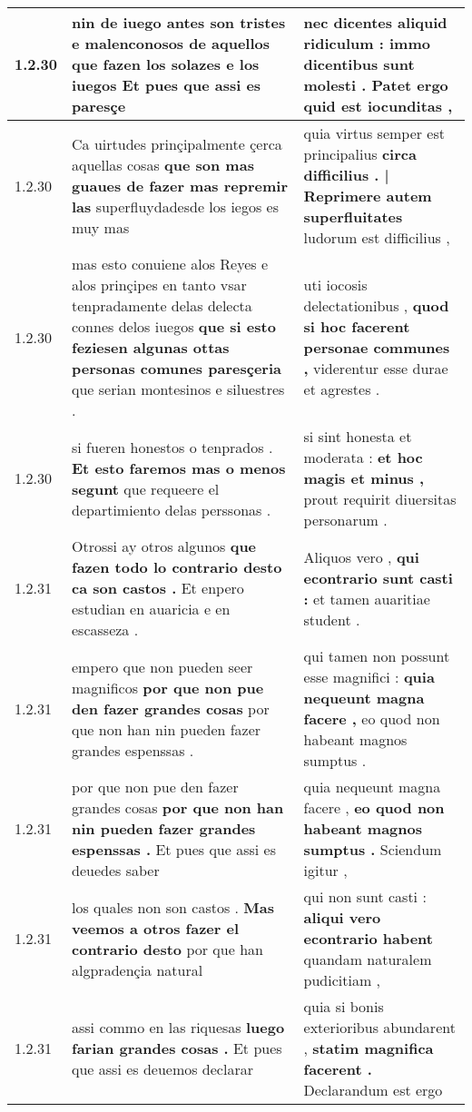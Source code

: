 \begin{tabular}{|p{1cm}|p{6.5cm}|p{6.5cm}|}
1.2.30 & nin de iuego antes son tristes e malenconosos de aquellos \textbf{ que fazen los solazes e los iuegos } Et pues que assi es paresçe & nec dicentes aliquid ridiculum : \textbf{ immo dicentibus sunt molesti . } Patet ergo quid est iocunditas , \\\hline
1.2.30 & Ca uirtudes prinçipalmente çerca aquellas cosas \textbf{ que son mas guaues de fazer mas repremir las } superfluydadesde los iegos es muy mas & quia virtus semper est principalius \textbf{ circa difficilius . | Reprimere autem superfluitates } ludorum est difficilius , \\\hline
1.2.30 & mas esto conuiene alos Reyes e alos prinçipes en tanto vsar tenpradamente delas delecta connes delos iuegos \textbf{ que si esto feziesen algunas ottas personas comunes paresçeria } que serian montesinos e siluestres . & uti iocosis delectationibus , \textbf{ quod si hoc facerent personae communes , } viderentur esse durae et agrestes . \\\hline
1.2.30 & si fueren honestos o tenprados . \textbf{ Et esto faremos mas o menos segunt } que requeere el departimiento delas perssonas . & si sint honesta et moderata : \textbf{ et hoc magis et minus , } prout requirit diuersitas personarum . \\\hline
1.2.31 & Otrossi ay otros algunos \textbf{ que fazen todo lo contrario desto ca son castos . } Et enpero estudian en auaricia e en escasseza . & Aliquos vero , \textbf{ qui econtrario sunt casti : } et tamen auaritiae student . \\\hline
1.2.31 & empero que non pueden seer magnificos \textbf{ por que non pue den fazer grandes cosas } por que non han nin pueden fazer grandes espenssas . & qui tamen non possunt esse magnifici : \textbf{ quia nequeunt magna facere , } eo quod non habeant magnos sumptus . \\\hline
1.2.31 & por que non pue den fazer grandes cosas \textbf{ por que non han nin pueden fazer grandes espenssas . } Et pues que assi es deuedes saber & quia nequeunt magna facere , \textbf{ eo quod non habeant magnos sumptus . } Sciendum igitur , \\\hline
1.2.31 & los quales non son castos . \textbf{ Mas veemos a otros fazer el contrario desto } por que han algpradençia natural & qui non sunt casti : \textbf{ aliqui vero econtrario habent } quandam naturalem pudicitiam , \\\hline
1.2.31 & assi commo en las riquesas \textbf{ luego farian grandes cosas . } Et pues que assi es deuemos declarar & quia si bonis exterioribus abundarent , \textbf{ statim magnifica facerent . } Declarandum est ergo \\\hline

\end{tabular}
